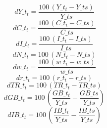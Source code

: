 \documentclass[10pt,a4paper]{article}
\begin{document}
\begin{dmath}
dY\_t_{t}=\frac{100\, \left(Y\_t_{t}-Y\_ts\right)}{Y\_ts}
\end{dmath}
\begin{dmath}
dC\_t_{t}=\frac{100\, \left(C\_t_{t}-C\_ts\right)}{C\_ts}
\end{dmath}
\begin{dmath}
dI\_t_{t}=\frac{100\, \left(I\_t_{t}-I\_ts\right)}{I\_ts}
\end{dmath}
\begin{dmath}
dN\_t_{t}=100\, \left(N\_t_{t}-N\_ts\right)
\end{dmath}
\begin{dmath}
dw\_t_{t}=\frac{100\, \left(w\_t_{t}-w\_ts\right)}{w\_ts}
\end{dmath}
\begin{dmath}
dr\_t_{t}=100\, \left(r\_t_{t}-r\_ts\right)
\end{dmath}
\begin{dmath}
dTR\_t_{t}=100\, \left(TR\_t_{t}-TR\_ts\right)
\end{dmath}
\begin{dmath}
dGB\_t_{t}=100\, \left(\frac{GB\_t_{t}}{Y\_ts}-\frac{GB\_ts}{Y\_ts}\right)
\end{dmath}
\begin{dmath}
dIB\_t_{t}=100\, \left(\frac{IB\_t_{t}}{Y\_ts}-\frac{IB\_ts}{Y\_ts}\right)
\end{dmath}
\end{document}
